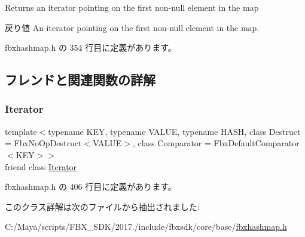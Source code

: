 Returns an iterator pointing on the first non-\/null element in the map \begin{DoxyReturn}{戻り値}
An iterator pointing on the first non-\/null element in the map. 
\end{DoxyReturn}


 fbxhashmap.\+h の 354 行目に定義があります。



\subsection{フレンドと関連関数の詳解}
\mbox{\label{class_fbx_hash_map_a9830fc407400559db7e7783cc10a9394}} 
\subsubsection{\texorpdfstring{Iterator}{Iterator}}
{\footnotesize\ttfamily template$<$typename K\+EY, typename V\+A\+L\+UE, typename H\+A\+SH, class Destruct = Fbx\+No\+Op\+Destruct$<$\+V\+A\+L\+U\+E$>$, class Comparator = Fbx\+Default\+Comparator$<$\+K\+E\+Y$>$$>$ \\
friend class \hyperlink{class_fbx_hash_map_1_1_iterator}{Iterator}\hspace{0.3cm}{\ttfamily [friend]}}



 fbxhashmap.\+h の 406 行目に定義があります。



このクラス詳解は次のファイルから抽出されました\+:\begin{DoxyCompactItemize}
\item 
C\+:/\+Maya/scripts/\+F\+B\+X\+\_\+\+S\+D\+K/2017./include/fbxsdk/core/base/\hyperlink{fbxhashmap_8h}{fbxhashmap.\+h}\end{DoxyCompactItemize}
